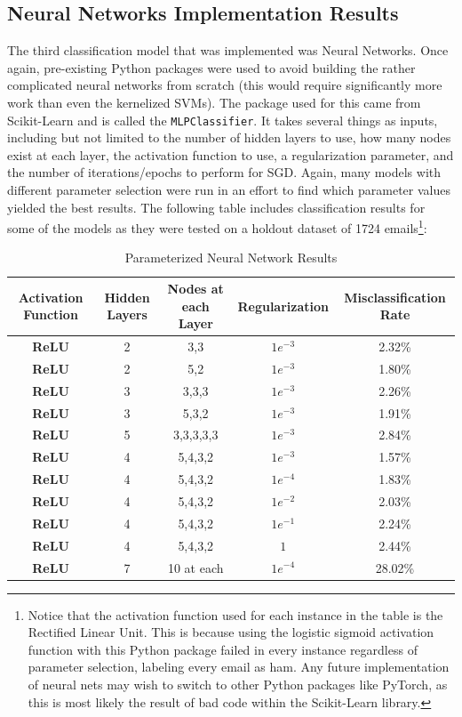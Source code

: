 \documentclass{article}
\begin{document}
\subsection{Neural Networks Implementation Results}
The third classification model that was implemented was Neural Networks. Once again, pre-existing Python packages were used to avoid building the rather complicated neural networks from scratch (this would require significantly more work than even the kernelized SVMs). The package used for this came from Scikit-Learn and is called the \texttt{MLPClassifier}. It takes several things as inputs, including but not limited to the number of hidden layers to use, how many nodes exist at each layer, the activation function to use, a regularization parameter, and the number of iterations/epochs to perform for SGD. Again, many models with different parameter selection were run in an effort to find which parameter values yielded the best results. The following table includes classification results for some of the models as they were tested on a holdout dataset of 1724 emails\footnote{Notice that the activation function used for each instance in the table is the Rectified Linear Unit. This is because using the logistic sigmoid activation function with this Python package failed in every instance regardless of parameter selection, labeling every email as ham. Any future implementation of neural nets may wish to switch to other Python packages like PyTorch, as this is most likely the result of bad code within the Scikit-Learn library.}:


\begin{table}[h!]
\begin{center}
\caption{Parameterized Neural Network Results}
\hspace*{-1cm}\begin{tabular}{c|c|c|c|c}
\textbf{Activation Function} & \textbf{Hidden Layers} & \textbf{Nodes at each Layer} & \textbf{Regularization} & \textbf{Misclassification Rate}\\
\hline
\textbf{ReLU} & 2 &3,3 &$1e^{-3}$ & 2.32\% \\
\textbf{ReLU} & 2 &5,2 &$1e^{-3}$ & 1.80\% \\
\textbf{ReLU} & 3 &3,3,3 &$1e^{-3}$ & 2.26\% \\
\textbf{ReLU} & 3 &5,3,2 &$1e^{-3}$ & 1.91\% \\
\textbf{ReLU} & 5 &3,3,3,3,3 &$1e^{-3}$ & 2.84\% \\
\textbf{ReLU} & 4 &5,4,3,2 &$1e^{-3}$ & 1.57\% \\
\textbf{ReLU} & 4 &5,4,3,2 &$1e^{-4}$ & 1.83\% \\
\textbf{ReLU} & 4 &5,4,3,2 &$1e^{-2}$ & 2.03\% \\
\textbf{ReLU} & 4 &5,4,3,2 &$1e^{-1}$ & 2.24\% \\
\textbf{ReLU} & 4 &5,4,3,2 &$1$ & 2.44\% \\
\textbf{ReLU} & 7 &10 at each &$1e^{-4}$ & 28.02\% \\
\end{tabular}
\end{center}
\end{table}
\end{document}
